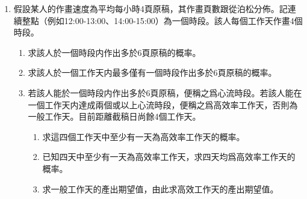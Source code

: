 \documentclass[12pt]{article}
\begin{document}
\begin{enumerate}
\begin{enumerate}
\begin{enumerate}
            \end{enumerate}
        \end{enumerate}
        \item 假設某人的作畫速度為平均每小時4頁原稿，其作畫頁數跟從泊松分佈。記連續整點（例如12:00-13:00、14:00-15:00）為一個時段。該人每個工作天作畫4個時段。\begin{enumerate}
            \item 求該人於一個時段内作出多於6頁原稿的概率。
            \item 求該人於一個工作天内最多僅有一個時段作出多於6頁原稿的概率。
            \item 若該人能於一個時段内作出多於6頁原稿，便稱之爲心流時段。若該人能在一個工作天内達成兩個或以上心流時段，便稱之爲高效率工作天，否則為一般工作天。目前距離截稿日尚餘4個工作天。\begin{enumerate}
                \item 求這四個工作天中至少有一天為高效率工作天的概率。
                \item 已知四天中至少有一天為高效率工作天，求四天均爲高效率工作天的概率。
                \item 求一般工作天的產出期望值，由此求高效工作天的產出期望值。
            \end{enumerate}
        \end{enumerate}
    \end{enumerate}
\end{document}

